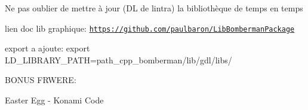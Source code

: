 Ne pas oublier de mettre à jour (D\+L de l\textquotesingle{}intra) la bibliothèque de temps en temps

lien doc lib graphique\+: \href{https://github.com/paulbaron/LibBombermanPackage}{\tt https\+://github.\+com/paulbaron/\+Lib\+Bomberman\+Package}

export a ajoute\+: export L\+D\+\_\+\+L\+I\+B\+R\+A\+R\+Y\+\_\+\+P\+A\+T\+H=path\+\_\+cpp\+\_\+bomberman/lib/gdl/libs/

B\+O\+N\+U\+S F\+R\+W\+E\+R\+E\+:
\begin{DoxyItemize}
\item Easter Egg -\/ Konami Code 
\end{DoxyItemize}